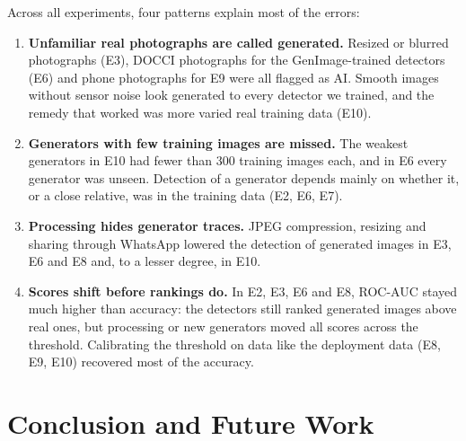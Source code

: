 \documentclass{mnnit}
\begin{document}
Across all experiments, four patterns explain most of the errors:
\begin{enumerate}
  \item \textbf{Unfamiliar real photographs are called generated.}
        Resized or blurred photographs (E3), DOCCI photographs for the
        GenImage-trained detectors (E6) and phone photographs for E9 were
        all flagged as AI. Smooth images without sensor noise look
        generated to every detector we trained, and the remedy that
        worked was more varied real training data (E10).
  \item \textbf{Generators with few training images are missed.} The
        weakest generators in E10 had fewer than 300 training images
        each, and in E6 every generator was unseen. Detection of a
        generator depends mainly on whether it, or a close relative, was
        in the training data (E2, E6, E7).
  \item \textbf{Processing hides generator traces.} JPEG compression,
        resizing and sharing through WhatsApp lowered the detection of
        generated images in E3, E6 and E8 and, to a lesser degree, in
        E10.
  \item \textbf{Scores shift before rankings do.} In E2, E3, E6 and E8,
        \mbox{ROC-AUC} stayed much higher than accuracy: the detectors still
        ranked generated images above real ones, but processing or new
        generators moved all scores across the threshold. Calibrating the
        threshold on data like the deployment data (E8, E9, E10) recovered
        most of the accuracy.
\end{enumerate}

\chapter{Conclusion and Future Work}
\label{chap:conclusion}
\end{document}
